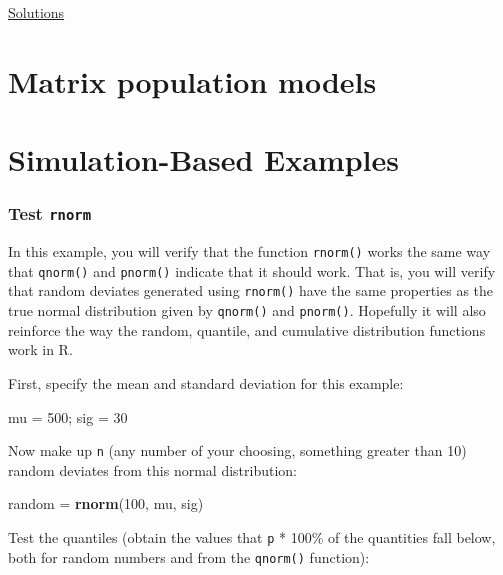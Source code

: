 \documentclass[]{book}
\newenvironment{Shaded}{\begin{snugshade}}{\end{snugshade}}
\newcommand{\DecValTok}[1]{\textcolor[rgb]{0.00,0.00,0.81}{#1}}
\newcommand{\KeywordTok}[1]{\textcolor[rgb]{0.13,0.29,0.53}{\textbf{#1}}}
\newcommand{\NormalTok}[1]{#1}
\newcommand{\StringTok}[1]{\textcolor[rgb]{0.31,0.60,0.02}{#1}}
\begin{document}
\protect\hyperlink{ex4f-answers}{Solutions}

\hypertarget{ch6}{%
\chapter{Matrix population models}\label{ch6}}

\hypertarget{sim-examples}{%
\chapter{Simulation-Based Examples}\label{sim-examples}}

\hypertarget{rnorm-ex}{%
\subsection{\texorpdfstring{Test \texttt{rnorm}}{Test rnorm}}\label{rnorm-ex}}

In this example, you will verify that the function \texttt{rnorm()} works the same way that \texttt{qnorm()} and \texttt{pnorm()} indicate that it should work. That is, you will verify that random deviates generated using \texttt{rnorm()} have the same properties as the true normal distribution given by \texttt{qnorm()} and \texttt{pnorm()}. Hopefully it will also reinforce the way the random, quantile, and cumulative distribution functions work in R.

First, specify the mean and standard deviation for this example:

\begin{Shaded}
\begin{Highlighting}[]
\NormalTok{mu =}\StringTok{ }\DecValTok{500}\NormalTok{; sig =}\StringTok{ }\DecValTok{30}
\end{Highlighting}
\end{Shaded}

Now make up \texttt{n} (any number of your choosing, something greater than 10) random deviates from this normal distribution:

\begin{Shaded}
\begin{Highlighting}[]
\NormalTok{random =}\StringTok{ }\KeywordTok{rnorm}\NormalTok{(}\DecValTok{100}\NormalTok{, mu, sig)}
\end{Highlighting}
\end{Shaded}

Test the quantiles (obtain the values that \texttt{p} * 100\% of the quantities fall below, both for random numbers and from the \texttt{qnorm()} function):
\end{document}
